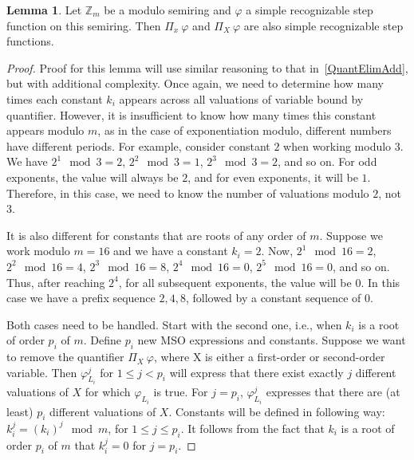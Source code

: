 \documentclass[12pt]{article}
\theoremstyle{definition}
\newtheorem{lemma}[theorem]{Lemma}
\begin{document}
\begin{lemma}
    \label{QuantElimMult}
    Let $\mathbb{Z}_m$ be a modulo semiring and $\varphi$ a simple recognizable step function on this semiring. Then $\Pi_x \ \varphi$ and $\Pi_X \ \varphi$ are also simple recognizable step functions.
\end{lemma}

\begin{proof}
    Proof for this lemma will use similar reasoning to that in~\cref{QuantElimAdd}, but with additional complexity. Once again, we need to determine how many times each constant $k_i$ appears across all valuations of variable bound by quantifier. However, it is insufficient to know how many times this constant appears modulo $m$, as in the case of exponentiation modulo, different numbers have different periods. For example, consider constant $2$ when working modulo $3$. We have $2^1 \mod 3 = 2$, $2^2 \mod 3 = 1$, $2^3 \mod 3 = 2$, and so on. For odd exponents, the value will always be $2$, and for even exponents, it will be $1$. Therefore, in this case, we need to know the number of valuations modulo $2$, not $3$. 

    It is also different for constants that are roots of any order of $m$. Suppose we work modulo $m = 16$ and we have a constant $k_i = 2$. Now, $2^1 \mod 16 = 2$, $2^2 \mod 16 = 4$, $2^3 \mod 16 = 8$, $2^4 \mod 16 = 0$, $2^5 \mod 16 = 0$, and so on. Thus, after reaching $2^4$, for all subsequent exponents, the value will be $0$. In this case we have a prefix sequence $2,4,8$, followed by a constant sequence of $0$.

    Both cases need to be handled. Start with the second one, i.e., when $k_i$ is a root of order $p_i$ of $m$. Define $p_i$ new MSO expressions and constants. Suppose we want to remove the quantifier $\Pi_X \ \varphi$, where X is either a first-order or second-order variable. Then $\varphi_{L_i}^j$ for $1 \leq j < p_i$ will express that there exist exactly $j$ different valuations of $X$ for which $\varphi_{L_i}$ is true. For $j = p_i$, $\varphi_{L_i}^j$ expresses that there are (at least) $p_i$ different valuations of $X$. Constants will be defined in following way: $k_i^j = (k_i)^j \mod m$, for $1 \leq j \leq p_i$. It follows from the fact that $k_i$ is a root of order $p_i$ of $m$ that $k_i^j = 0$ for $j = p_i$.


\end{proof}
\end{document}
